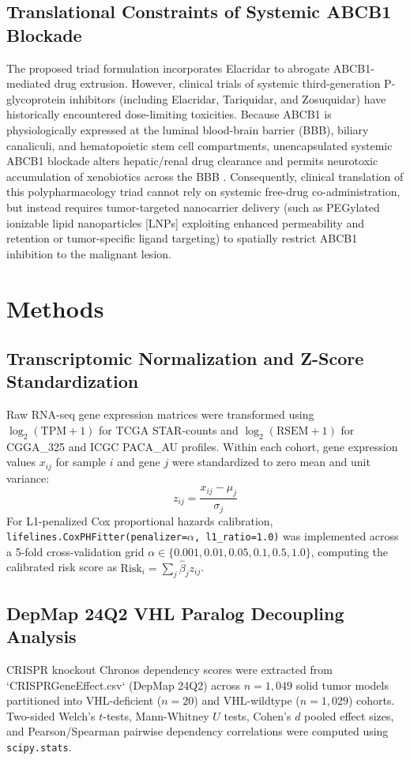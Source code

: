 \documentclass[11pt,a4paper]{article}
\begin{document}
\subsection{Translational Constraints of Systemic ABCB1 Blockade}
The proposed triad formulation incorporates Elacridar to abrogate ABCB1-mediated drug extrusion. However, clinical trials of systemic third-generation P-glycoprotein inhibitors (including Elacridar, Tariquidar, and Zosuquidar) have historically encountered dose-limiting toxicities. Because ABCB1 is physiologically expressed at the luminal blood-brain barrier (BBB), biliary canaliculi, and hematopoietic stem cell compartments, unencapsulated systemic ABCB1 blockade alters hepatic/renal drug clearance and permits neurotoxic accumulation of xenobiotics across the BBB \cite{elacridar2016}. Consequently, clinical translation of this polypharmacology triad cannot rely on systemic free-drug co-administration, but instead requires tumor-targeted nanocarrier delivery (such as PEGylated ionizable lipid nanoparticles [LNPs] exploiting enhanced permeability and retention or tumor-specific ligand targeting) to spatially restrict ABCB1 inhibition to the malignant lesion.

\section{Methods}

\subsection{Transcriptomic Normalization and Z-Score Standardization}
Raw RNA-seq gene expression matrices were transformed using $\log_2(\text{TPM} + 1)$ for TCGA STAR-counts and $\log_2(\text{RSEM} + 1)$ for CGGA\_325 and ICGC PACA\_AU profiles. Within each cohort, gene expression values $x_{ij}$ for sample $i$ and gene $j$ were standardized to zero mean and unit variance:
\[
z_{ij} = \frac{x_{ij} - \mu_j}{\sigma_j}
\]
For L1-penalized Cox proportional hazards calibration, \texttt{lifelines.CoxPHFitter(penalizer=$\alpha$, l1\_ratio=1.0)} was implemented across a 5-fold cross-validation grid $\alpha \in \{0.001, 0.01, 0.05, 0.1, 0.5, 1.0\}$, computing the calibrated risk score as $\text{Risk}_i = \sum_{j} \hat{\beta}_j z_{ij}$.

\subsection{DepMap 24Q2 VHL Paralog Decoupling Analysis}
CRISPR knockout Chronos dependency scores were extracted from `CRISPRGeneEffect.csv` (DepMap 24Q2) across $n = 1,049$ solid tumor models partitioned into VHL-deficient ($n = 20$) and VHL-wildtype ($n = 1,029$) cohorts. Two-sided Welch's $t$-tests, Mann-Whitney $U$ tests, Cohen's $d$ pooled effect sizes, and Pearson/Spearman pairwise dependency correlations were computed using \texttt{scipy.stats}.
\end{document}
